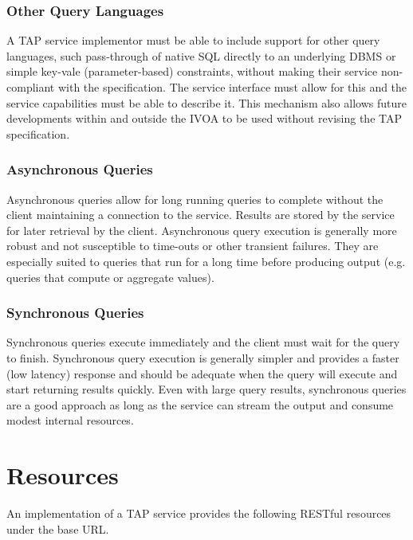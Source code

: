 \documentclass[11pt,letter]{ivoa}
\begin{document}
\subsubsection{Other Query Languages}
A TAP service implementor must be able to include support for other query languages, such
pass-through of native SQL directly to an underlying DBMS or simple key-vale 
(parameter-based) constraints, without making their service non-compliant with the specification. The service interface must allow for 
this and the service capabilities must be able to describe it. This mechanism 
also allows future developments within and outside the IVOA to be used without 
revising the TAP specification.

\subsubsection{Asynchronous Queries}
Asynchronous queries allow for long running queries to complete without 
the client maintaining a connection to the service. Results are stored by 
the service for later retrieval by the client. Asynchronous query 
execution is generally more robust and not susceptible to time-outs or other 
transient failures. They are especially suited to queries that run for a long 
time before producing output (e.g. queries that compute or aggregate values).

\subsubsection{Synchronous Queries}
Synchronous queries execute immediately  and the client must wait for the query 
to finish. Synchronous query execution is generally simpler and provides a 
faster (low latency) response and should be adequate when the query will execute 
and start returning results quickly. Even with large query results, synchronous 
queries are a good approach as long as the service can stream the output 
and consume modest internal resources. 

\section{Resources}
\label{sec:resources}

An implementation of a TAP service provides the following RESTful resources 
under the base URL.
\end{document}
